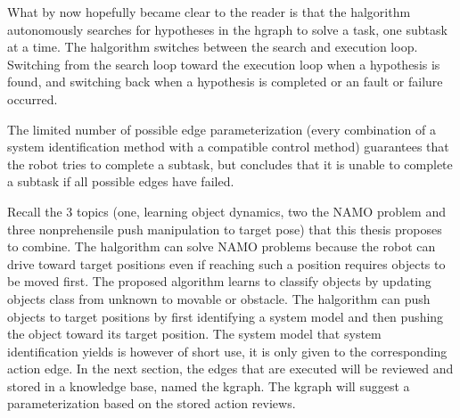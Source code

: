 

What by now hopefully became clear to the reader is that the \ac{halgorithm} autonomously searches for hypotheses in the \ac{hgraph} to solve a task, one subtask at a time. The \ac{halgorithm} switches between the search and execution loop. Switching from the search loop toward the execution loop when a hypothesis is found, and switching back when a hypothesis is completed or an fault or failure occurred.\bs

The limited number of possible edge parameterization (every combination of a system identification method with a compatible control method) guarantees that the robot tries to complete a subtask, but concludes that it is unable to complete a subtask if all possible edges have failed.\bs

Recall the 3 topics (one, learning object dynamics, two the \ac{NAMO} problem and three nonprehensile push manipulation to target pose) that this thesis proposes to combine. The \ac{halgorithm} can solve \ac{NAMO} problems because the robot can drive toward target positions even if reaching such a position requires objects to be moved first. The proposed algorithm learns to classify objects by updating objects class from unknown to movable or obstacle. The \ac{halgorithm} can push objects to target positions by first identifying a system model and then pushing the object toward its target position. The system model that system identification yields is however of short use, it is only given to the corresponding action edge. In the next section, the edges that are executed will be reviewed and stored in a knowledge base, named the \acf{kgraph}. The \ac{kgraph} will suggest a parameterization based on the stored action reviews.\bs
